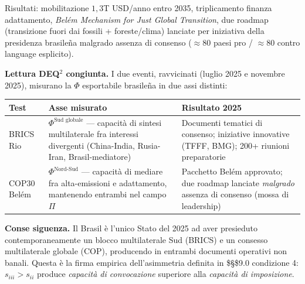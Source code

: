 Risultati: mobilitazione \(1{,}3\)T USD/anno entro 2035, triplicamento
finanza adattamento, \emph{Belém Mechanism for Just Global Transition},
due roadmap (transizione fuori dai fossili + foreste/clima) lanciate per
iniziativa della presidenza brasileña malgrado assenza di consenso
(\(\approx 80\) paesi pro / \(\approx 80\) contro language esplicito).

\Hypoth{} \textbf{Lettura DEQ$^2$ congiunta.} I due eventi, ravvicinati
(luglio 2025 e novembre 2025), misurano la \(\Phi\) esportabile
brasileña in due assi distinti:

{\def\LTcaptype{none} %
{\small\begin{longtable}[]{@{}
  >{\raggedright\arraybackslash}p{}
  >{\raggedright\arraybackslash}p{}
  >{\raggedright\arraybackslash}p{}@{}}
\toprule\noalign{}
\begin{minipage}[b]{\linewidth}\raggedright
Test
\end{minipage} & \begin{minipage}[b]{\linewidth}\raggedright
Asse misurato
\end{minipage} & \begin{minipage}[b]{\linewidth}\raggedright
Risultato 2025
\end{minipage} \\
\midrule\noalign{}
\endhead
\bottomrule\noalign{}
\endlastfoot
BRICS Rio & \(\Phi^{\text{Sud globale}}\) --- capacità di sintesi
multilaterale fra interessi divergenti (China-India, Rusia-Iran,
Brasil-mediatore) & Documenti tematici di consenso; iniziative
innovative (TFFF, BMG); 200+ riunioni preparatorie \\
COP30 Belém & \(\Phi^{\text{Nord-Sud}}\) --- capacità di mediare fra
alta-emissioni e adattamento, mantenendo entrambi nel campo \(\Pi\) &
Pacchetto Belém approvato; due roadmap lanciate \emph{malgrado} assenza
di consenso (mossa di leadership) \\
\end{longtable}}
}

\Proved{} \textbf{Conse siguenza.} Il Brasil è l'unico Stato del 2025 ad
aver presieduto contemporaneamente un blocco multilaterale Sud (BRICS) e
un consesso multilaterale globale (COP), producendo in entrambi
documenti operativi non banali. Questa è la firma empirica
dell'asimmetria definita in \$\S\$9.0 condizione 4: \(s_{iii} > s_{ii}\)
produce \emph{capacità di convocazione} superiore alla \emph{capacità di
imposizione}.

